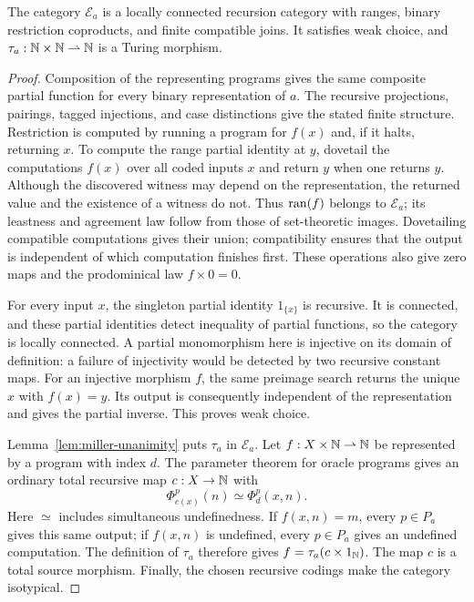 \begin{proposition}\label{prop:miller-category}
The category $\mathcal E_a$ is a locally connected recursion category
with ranges, binary restriction coproducts, and finite compatible joins.
It satisfies weak choice, and $\tau_a:\mathbb N\times\mathbb N\rightharpoonup\mathbb N$
is a Turing morphism.
\end{proposition}
\begin{proof}
Composition of the representing programs gives the same composite
partial function for every binary representation of $a$.
The recursive projections, pairings,
tagged injections, and case distinctions give the stated finite
structure. Restriction is computed by running a program for $f(x)$ and,
if it halts, returning $x$. To compute the range partial identity at
$y$, dovetail the computations $f(x)$ over all coded inputs $x$ and
return $y$ when one returns $y$. Although the discovered witness may
depend on the representation, the returned value and the existence of a witness
do not. Thus $\operatorname{ran}(f)$ belongs to $\mathcal E_a$; its leastness and
agreement law follow from those of set-theoretic images.
Dovetailing compatible computations gives their union;
compatibility ensures that the output is independent of which
computation finishes first. These operations also give zero maps and
the prodominical law $f\times0=0$.

For every input $x$, the singleton partial identity $1_{\{x\}}$ is
recursive. It is connected, and these partial identities detect
inequality of partial functions, so the category is locally connected.
A partial monomorphism here is injective on its domain of definition: a failure of
injectivity would be detected by two recursive constant maps. For an
injective morphism $f$, the same preimage search returns the unique $x$
with $f(x)=y$. Its output is consequently independent of the representation and
gives the partial inverse. This proves weak choice.

Lemma~\ref{lem:miller-unanimity} puts $\tau_a$ in $\mathcal E_a$.
Let $f:X\times\mathbb N\rightharpoonup\mathbb N$ be represented by a program with
index $d$. The parameter theorem for oracle programs gives an ordinary
total recursive map $c:X\to\mathbb N$ with
\[
 \Phi_{c(x)}^p(n)\simeq\Phi_d^p(x,n).
\]
Here $\simeq$ includes simultaneous undefinedness.
If $f(x,n)=m$, every $p\in P_a$ gives this same output; if $f(x,n)$ is
undefined, every $p\in P_a$ gives an undefined computation. The definition
of $\tau_a$ therefore gives
$f=\tau_a(c\times1_{\mathbb N})$. The map $c$ is a total source morphism.
Finally, the chosen recursive codings make the category isotypical.
\end{proof}

